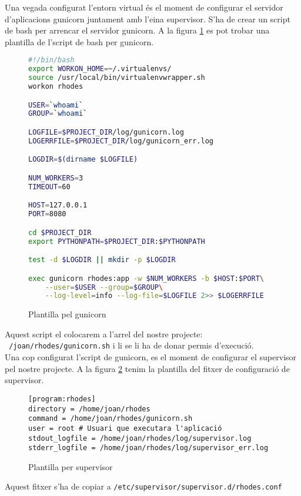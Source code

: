Una vegada configurat l'entorn virtual és el moment de configurar el servidor d'aplicacions gunicorn juntament amb l'eina supervisor. S'ha de crear un script de bash per arrencar el servidor gunicorn. A la figura \ref{fig:gunicorn} es pot trobar una plantilla de l'script de bash per gunicorn.

\begin{figure}[h!]
	\begin{lstlisting}[language=bash]
#!/bin/bash
export WORKON_HOME=~/.virtualenvs/
source /usr/local/bin/virtualenvwrapper.sh
workon rhodes

USER=`whoami`
GROUP=`whoami`

LOGFILE=$PROJECT_DIR/log/gunicorn.log
LOGERRFILE=$PROJECT_DIR/log/gunicorn_err.log

LOGDIR=$(dirname $LOGFILE)

NUM_WORKERS=3
TIMEOUT=60

HOST=127.0.0.1
PORT=8080

cd $PROJECT_DIR
export PYTHONPATH=$PROJECT_DIR:$PYTHONPATH

test -d $LOGDIR || mkdir -p $LOGDIR

exec gunicorn rhodes:app -w $NUM_WORKERS -b $HOST:$PORT\
    --user=$USER --group=$GROUP\
    --log-level=info --log-file=$LOGFILE 2>> $LOGERRFILE
	\end{lstlisting}
	\caption{Plantilla pel gunicorn}
	\label{fig:gunicorn}
\end{figure}
Aquest script el colocarem a l'arrel del nostre projecte: \texttt{~/joan/rhodes/gunicorn.sh} i li se li ha de donar permis d'execució.\\

Una cop configurat l'script de gunicorn, es el moment de configurar el supervisor pel nostre projecte. A la figura \ref{fig:supervisor} tenim la plantilla del fitxer de configuració de supervisor.
\begin{figure}[h!]
	\begin{verbatim}
[program:rhodes]
directory = /home/joan/rhodes
command = /home/joan/rhodes/gunicorn.sh
user = root # Usuari que executara l'aplicació
stdout_logfile = /home/joan/rhodes/log/supervisor.log
stderr_logfile = /home/joan/rhodes/log/supervisor_err.log
	\end{verbatim}
	\caption{Plantilla per supervisor}
	\label{fig:supervisor}
\end{figure}

Aquest fitxer s'ha de copiar a \texttt{/etc/supervisor/supervisor.d/rhodes.conf}

